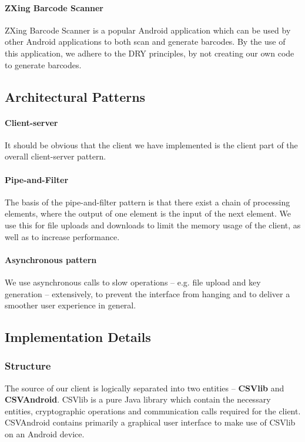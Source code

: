 \documentclass[pdftex,english,10pt,b5paper,twoside]{book}
\begin{document}
\paragraph{ZXing Barcode Scanner} ZXing Barcode Scanner is a popular Android
application which can be used by other Android applications to both scan and
generate barcodes. By the use of this application, we adhere to the \ac{DRY}
principles, by not creating our own code to generate barcodes.

\subsection{Architectural Patterns}

\paragraph{Client-server} It should be obvious that the client we have
implemented is the client part of the overall client-server pattern.

\paragraph{Pipe-and-Filter} The basis of the pipe-and-filter pattern is that
there exist a chain of processing elements, where the output of one element is
the input of the next element. We use this for file uploads and downloads to
limit the memory usage of the client, as well as to increase performance.

\paragraph{Asynchronous pattern} We use asynchronous calls to slow operations
-- e.g. file upload and key generation -- extensively, to prevent the interface
from hanging and to deliver a smoother user experience in general.  

\subsection{Implementation Details}

\subsubsection{Structure}
 
The source of our client is logically separated into two entities --
\textbf{CSVlib} and \textbf{CSVAndroid}. CSVlib is a pure Java library which
contain the necessary entities, cryptographic operations and communication
calls required for the client. CSVAndroid contains primarily a graphical user
interface to make use of CSVlib on an Android device.
\end{document}
